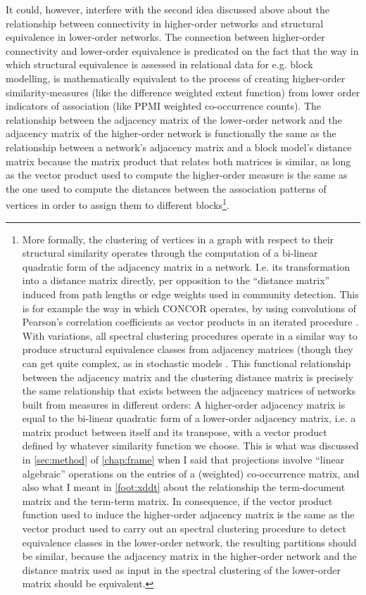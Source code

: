 It could, however, interfere with the second idea discussed above about the relationship between connectivity in higher-order networks and structural equivalence in lower-order networks.
The connection between higher-order connectivity and lower-order equivalence is predicated on the fact that the way in which structural equivalence is assessed in relational data for e.g. block modelling, is mathematically equivalent to the process of creating higher-order similarity-measures (like the difference weighted extent function) from lower order indicators of association (like PPMI weighted co-occurrence counts).
The relationship between the adjacency matrix of the lower-order network and the adjacency matrix of the higher-order network is functionally the same as the relationship between a network's adjacency matrix and a block model's distance matrix because the matrix product that relates both matrices is similar, as long as the vector product used to compute the higher-order measure is the same as the one used to compute the distances between the association patterns of vertices in order to assign them to different blocks\footnote{
    More formally, the clustering of vertices in a graph with respect to their structural similarity operates through the computation of a bi-linear quadratic form of the adjacency matrix in a network.
    I.e. its transformation into a distance matrix directly, per opposition to the ``distance matrix'' induced from path lengths or edge weights used in community detection.
    This is for example the way in which CONCOR operates, by using convolutions of Pearson's correlation coefficients as vector products in an iterated procedure \citep{breiger1975}.
    With variations, all spectral clustering procedures operate in a similar way to produce structural equivalence classes from adjacency matrices (though they can get quite complex, as in stochastic models \citep[, appendix 2A]{nowicki2001,accominotti2016}.
    This functional relationship between the adjacency matrix and the clustering distance matrix is precisely the same relationship that exists between the adjacency matrices of networks built from measures in different orders:
    A higher-order adjacency matrix is equal to the bi-linear quadratic form of a lower-order adjacency matrix, i.e. a matrix product between itself and its transpose, with a vector product defined by whatever similarity function we choose.
    This is what was discussed in \autoref{sec:method} of \autoref{chap:frame} when I said that projections involve ``linear algebraic'' operations on the entries of a (weighted) co-occurrence matrix, and also what I meant in \autoref{foot:xddt} about the relationship the term-document matrix and the term-term matrix.
    In consequence, if the vector product function used to induce the higher-order adjacency matrix is the same as the vector product used to carry out an spectral clustering procedure to detect equivalence classes in the lower-order network, the resulting partitions should be similar, because the adjacency matrix in the higher-order network and the distance matrix used as input in the spectral clustering of the lower-order matrix should be equivalent.
}.

